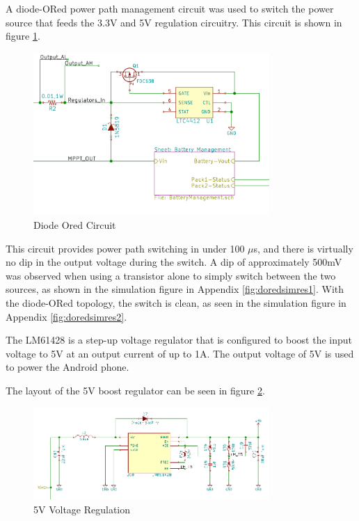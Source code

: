 \documentclass{article}
\numberwithin{figure}{section}
\numberwithin{equation}{section}
\begin{document}
{A diode-ORed power path management circuit was used to switch the power source that feeds the 3.3V and 5V regulation circuitry. This circuit is shown in figure \ref{fig:dored}.
\begin{figure}[H]
	\centering
	\includegraphics[width=0.8\textwidth]{DiodeOR}
	\caption{Diode Ored Circuit}
	\label{fig:dored}
\end{figure}

This circuit provides power path switching in under 100 $\mu$s, and there is virtually no dip in the output voltage during the switch. A dip of approximately 500mV was observed when using a transistor alone to simply switch between the two sources, as shown in the simulation figure in Appendix \ref{fig:doredsimres1}. With the diode-ORed topology, the switch is clean, as seen in the simulation figure in Appendix \ref{fig:doredsimres2}.

\bigskip
The LM61428 is a step-up voltage regulator that is configured to boost the input voltage to 5V at an output current of up to 1A. The output voltage of 5V is used to power the Android phone.


\bigskip
The layout of the 5V boost regulator can be seen in figure \ref{fig:ps5}.
\begin{figure}[H]
	\centering
	\includegraphics[width=0.8\textwidth]{PS5V}
	\caption{5V Voltage Regulation}
	\label{fig:ps5}
\end{figure}

}
\end{document}
